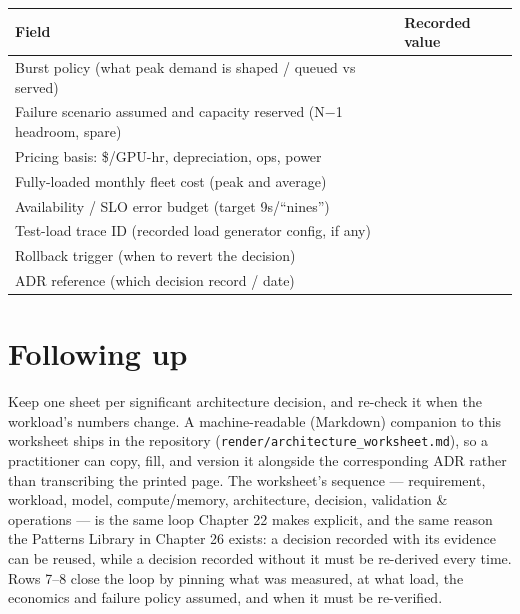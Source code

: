 \begin{tabular}{@{}p{4.6cm}p{5.2cm}@{}}
\toprule
\textbf{Field} & \textbf{Recorded value} \\
\midrule
Burst policy (what peak demand is shaped / queued vs served) & \\
Failure scenario assumed and capacity reserved (N$-$1 headroom, spare) & \\
Pricing basis: \$/GPU-hr, depreciation, ops, power & \\
Fully-loaded monthly fleet cost (peak and average) & \\
Availability / SLO error budget (target 9s/``nines'') & \\
Test-load trace ID (recorded load generator config, if any) & \\
Rollback trigger (when to revert the decision) & \\
ADR reference (which decision record / date) & \\
\bottomrule
\end{tabular}

\section*{Following up}

Keep one sheet per significant architecture decision, and re-check it when
the workload's numbers change. A machine-readable (Markdown) companion to this
worksheet ships in the repository (\texttt{render/architecture\_worksheet.md}),
so a practitioner can copy, fill, and version it alongside the corresponding
ADR rather than transcribing the printed page. The worksheet's sequence --- requirement,
workload, model, compute/memory, architecture, decision, validation \&
operations --- is the same loop Chapter 22 makes explicit, and the same reason
the Patterns Library in Chapter 26 exists: a decision recorded with its
evidence can be reused, while a decision recorded without it must be
re-derived every time. Rows 7--8 close the loop by pinning what was measured, at what load, the economics and failure policy assumed, and when it must be re-verified.
